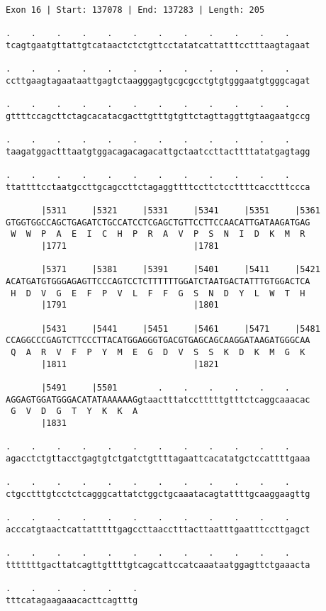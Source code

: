 \documentclass{article}
\begin{document}
\newpage
\begin{Verbatim}
Exon 16 | Start: 137078 | End: 137283 | Length: 205
 
.    .    .    .    .    .    .    .    .    .    .    .    
tcagtgaatgttattgtcataactctctgttcctatatcattatttcctttaagtagaat
  
.    .    .    .    .    .    .    .    .    .    .    .    
ccttgaagtagaataattgagtctaagggagtgcgcgcctgtgtgggaatgtgggcagat
  
.    .    .    .    .    .    .    .    .    .    .    .    
gttttccagcttctagcacatacgacttgtttgtgttctagttaggttgtaagaatgccg
  
.    .    .    .    .    .    .    .    .    .    .    .    
taagatggactttaatgtggacagacagacattgctaatccttacttttatatgagtagg
  
.    .    .    .    .    .    .    .    .    .    .    .    
ttattttcctaatgccttgcagccttctagaggttttccttctccttttcacctttccca
  
       |5311     |5321     |5331     |5341     |5351     |5361
GTGGTGGCCAGCTGAGATCTGCCATCCTCGAGCTGTTCCTTCCAACATTGATAAGATGAG
 W  W  P  A  E  I  C  H  P  R  A  V  P  S  N  I  D  K  M  R 
       |1771                         |1781                  
  
       |5371     |5381     |5391     |5401     |5411     |5421
ACATGATGTGGGAGAGTTCCCAGTCCTCTTTTTTGGATCTAATGACTATTTGTGGACTCA
 H  D  V  G  E  F  P  V  L  F  F  G  S  N  D  Y  L  W  T  H 
       |1791                         |1801                  
  
       |5431     |5441     |5451     |5461     |5471     |5481
CCAGGCCCGAGTCTTCCCTTACATGGAGGGTGACGTGAGCAGCAAGGATAAGATGGGCAA
 Q  A  R  V  F  P  Y  M  E  G  D  V  S  S  K  D  K  M  G  K 
       |1811                         |1821                  
  
       |5491     |5501        .    .    .    .    .    .    
AGGAGTGGATGGGACATATAAAAAAGgtaactttatcctttttgtttctcaggcaaacac
 G  V  D  G  T  Y  K  K  A                                  
       |1831                                                
  
.    .    .    .    .    .    .    .    .    .    .    .    
agacctctgttacctgagtgtctgatctgttttagaattcacatatgctccattttgaaa
  
.    .    .    .    .    .    .    .    .    .    .    .    
ctgcctttgtcctctcagggcattatctggctgcaaatacagtattttgcaaggaagttg
  
.    .    .    .    .    .    .    .    .    .    .    .    
acccatgtaactcattatttttgagccttaacctttacttaatttgaatttccttgagct
  
.    .    .    .    .    .    .    .    .    .    .    .    
tttttttgacttatcagttgttttgtcagcattccatcaaataatggagttctgaaacta
  
.    .    .    .    .    .
tttcatagaagaaacacttcagtttg
\end{Verbatim}
\end{document}
